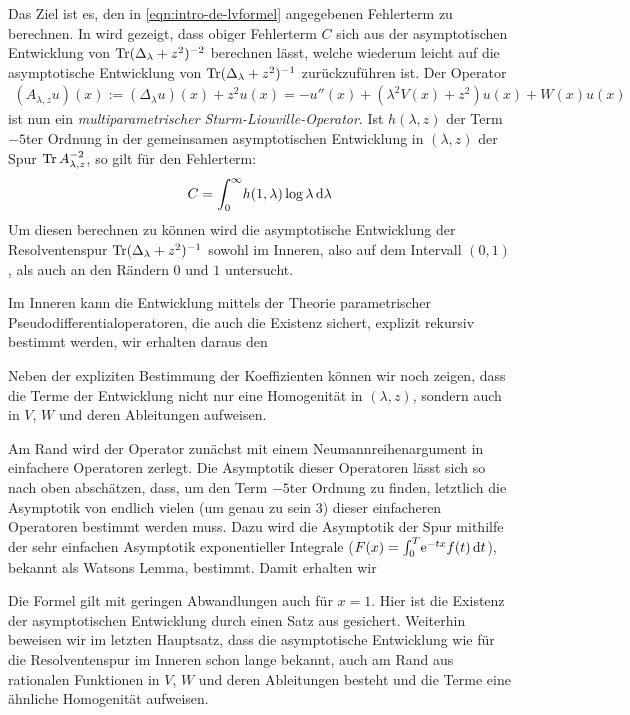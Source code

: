 Das Ziel ist es, den in \eqref{eqn:intro-de-lvformel} angegebenen Fehlerterm zu
berechnen. In \cite{LV13} wird gezeigt, dass obiger Fehlerterm $C$ sich aus der
asymptotischen Entwicklung von $\Tr(\Delta_\lambda + z^2)^{-2}$ berechnen lässt,
welche wiederum leicht auf die asymptotische Entwicklung von $\Tr(\Delta_\lambda
+ z^2)^{-1}$ zurückzuführen ist. Der Operator
\begin{align*}
  (A_{\lambda,z}u)(x) := (\Delta_\lambda u)(x) + z^2 u(x)
           = -u''(x) + (\lambda^2 V(x) + z^2) u(x) + W(x) u(x)
\end{align*}
ist nun ein \emph{multiparametrischer Sturm-Liouville-Operator}. Ist $h(\lambda,
z)$ der Term $-5$ter Ordnung in der gemeinsamen asymptotischen Entwicklung in
$(\lambda,z)$ der Spur $\Tr A_{\lambda,z}^{-2}$, so gilt für den Fehlerterm:
\begin{align*}
  C = \Integ[\infty]{0}{\lambda}{h(1,\lambda)\log\lambda}
\end{align*}
Um diesen berechnen zu können wird die asymptotische Entwicklung der
Resolventenspur $\Tr(\Delta_\lambda + z^2)^{-1}$ sowohl im Inneren, also auf dem
Intervall $(0,1)$, als auch an den Rändern $0$ und $1$ untersucht.

Im Inneren kann die Entwicklung mittels der Theorie parametrischer
Pseudodifferentialoperatoren, die auch die Existenz sichert, explizit rekursiv
bestimmt werden, wir erhalten daraus den 
\begin{Hauptsatz}
  
\end{Hauptsatz}
Neben der expliziten Bestimmung der Koeffizienten können wir noch zeigen, dass
die Terme der Entwicklung nicht nur eine Homogenität in $(\lambda,z)$, sondern
auch in $V$, $W$ und deren Ableitungen aufweisen.

Am Rand wird der Operator zunächst mit einem Neumannreihenargument in
einfachere Operatoren zerlegt. Die Asymptotik dieser Operatoren lässt sich so nach
oben abschätzen, dass, um den Term $-5$ter Ordnung zu finden, letztlich die
Asymptotik von endlich vielen (um genau zu sein 3) dieser einfacheren Operatoren
bestimmt werden muss. Dazu wird die Asymptotik der Spur mithilfe der sehr
einfachen Asymptotik exponentieller Integrale ($F(x) =
\Integ[T]{0}{t}{\Eto{-tx}f(t)}$), bekannt als Watsons Lemma, bestimmt. Damit
erhalten wir
\begin{Hauptsatz}
  
\end{Hauptsatz}
Die Formel gilt mit geringen Abwandlungen auch für $x=1$. Hier ist die Existenz
der asymptotischen Entwicklung durch einen Satz aus \cite{LV13} gesichert.
Weiterhin beweisen wir im letzten Hauptsatz, dass die asymptotische
Entwicklung wie für die Resolventenspur im Inneren schon lange bekannt, auch am
Rand aus rationalen Funktionen in $V$, $W$ und deren Ableitungen besteht und die
Terme eine ähnliche Homogenität aufweisen.

